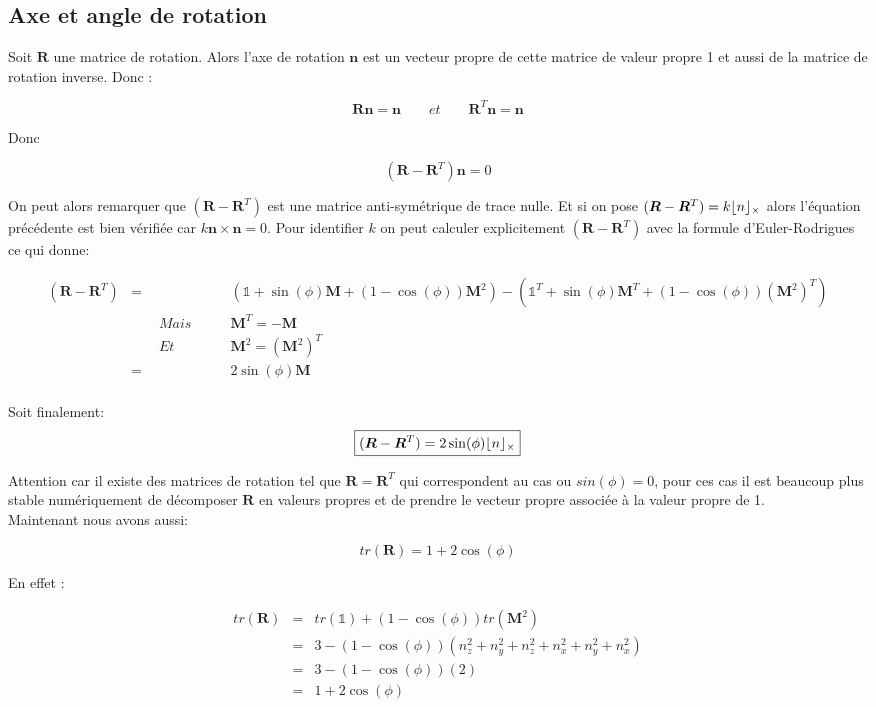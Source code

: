 \documentclass[12pt,a4paper]{article}
\DeclarePairedDelimiter\floor{\lfloor}{\rfloor}
\newcommand{\unit}
{
\bm{\mathds{1}}
}
\begin{document}
	\newpage
	\subsection{Axe et angle de rotation}
	
Soit $\bm{R}$ une matrice de rotation. Alors l'axe de rotation $\bm{n}$ est un vecteur propre de cette matrice de valeur propre 1 et aussi de la matrice de rotation inverse. Donc :

\[
\bm{R}\bm{n}=\bm{n} \qquad et \qquad \bm{R}^T\bm{n}=\bm{n}
\]  

Donc 

\[
\boxed{(\bm{R}-\bm{R}^T)\bm{n}=0}
\]

On peut alors remarquer que $(\bm{R}-\bm{R}^T)$ est une matrice anti-symétrique de trace nulle. Et si on pose 
$(\bm{R}-\bm{R}^T)=k \floor{n}_{\times}$ alors l'équation précédente est bien vérifiée car $k \bm{n}\times \bm{n}=0$. Pour identifier $k$ on peut calculer explicitement $(\bm{R}-\bm{R}^T)$ avec la formule d'Euler-Rodrigues ce qui donne:

\begin{eqnarray*}
	(\bm{R}-\bm{R}^T)&=& (\unit +\sin(\phi) \bm{M}+(1-\cos(\phi))\bm{M}^2)-(\unit^T +\sin(\phi) \bm{M}^T+(1-\cos(\phi))(\bm{M}^2)^T)\\
	&\qquad Mais\qquad& \bm{M}^T=-\bm{M}\\
	&\qquad Et \qquad& \bm{M}^2=(\bm{M}^2)^T\\
	&=& 2 \sin(\phi) \bm{M}\\
\end{eqnarray*}

Soit finalement:
\[
\boxed{(\bm{R}-\bm{R}^T)=2 \sin(\phi)\floor{n}_{\times}}
\]

Attention car il existe des matrices de rotation tel que $\bm{R}=\bm{R}^T$ qui correspondent au cas ou $sin(\phi)=0$, pour ces cas il est beaucoup plus stable numériquement de décomposer $\bm{R}$ en valeurs propres et de prendre le vecteur propre associée à la valeur propre de 1.\\

Maintenant nous avons aussi:

\[
	\boxed{tr(\bm{R})=1+2 \cos(\phi)}
\]

En effet :

\begin{eqnarray*}
tr(\bm{R})&=&tr(\unit)+(1-\cos(\phi)) tr(\bm{M}^2)\\
&=&3-(1-\cos(\phi))(n_z^2+n_y^2+n_z^2+n_x^2+n_y^2+n_x^2)\\
&=&3-(1-\cos(\phi))(2)\\
&=&1+2 \cos(\phi)\\
\end{eqnarray*}
	
\end{document}
